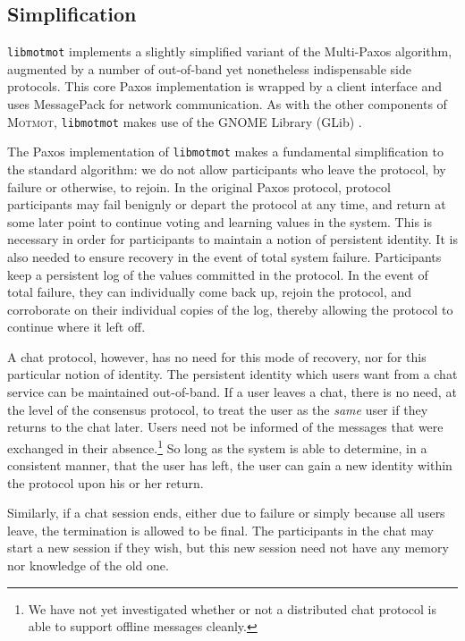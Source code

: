 \documentclass{sig-alternate}
\newcommand\Motmot{\textsc{Motmot}\xspace}
\newcommand\libmotmot{\texttt{libmotmot}\xspace}
\begin{document}
\subsection{Simplification}

\libmotmot implements a slightly simplified variant of the Multi-Paxos
algorithm, augmented by a number of out-of-band yet nonetheless indispensable
side protocols.  This core Paxos implementation is wrapped by a client
interface and uses MessagePack \cite{msgpack} for network communication.
As with the other components of \Motmot, \libmotmot makes use of the GNOME
Library (GLib) \cite{glib}.

The Paxos implementation of \libmotmot makes a fundamental simplification to
the standard algorithm: we do not allow participants who leave the protocol, by
failure or otherwise, to rejoin.  In the original Paxos protocol, protocol
participants may fail benignly or depart the protocol at any time, and return
at some later point to continue voting and learning values in the system.
This is necessary in order for participants to maintain a notion of persistent
identity.  It is also needed to ensure recovery in the event of total system
failure.  Participants keep a persistent log of the values committed in the
protocol.  In the event of total failure, they can individually come back up,
rejoin the protocol, and corroborate on their individual copies of the log,
thereby allowing the protocol to continue where it left off.

A chat protocol, however, has no need for this mode of recovery, nor for this
particular notion of identity.  The persistent identity which users want from
a chat service can be maintained out-of-band.  If a user leaves a chat, there
is no need, at the level of the consensus protocol, to treat the user as the
\emph{same} user if they returns to the chat later.  Users need not be informed
of the messages that were exchanged in their absence.\footnote{We have not yet
investigated whether or not a distributed chat protocol is able to support
offline messages cleanly.}  So long as the system is able to determine, in a
consistent manner, that the user has left, the user can gain a new identity
within the protocol upon his or her return.

Similarly, if a chat session ends, either due to failure or simply because all
users leave, the termination is allowed to be final.  The participants in the
chat may start a new session if they wish, but this new session need not have
any memory nor knowledge of the old one.
\end{document}
